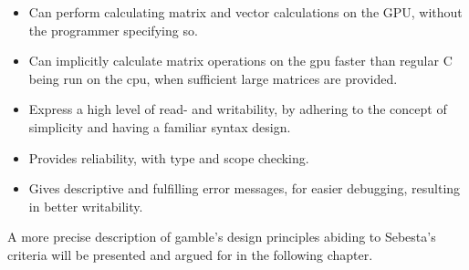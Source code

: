 \begin{itemize}
	\item Can perform calculating matrix and vector calculations on the GPU, without the programmer specifying so.
	\item Can implicitly calculate matrix operations on the \acrshort{gpu} faster than regular C being run on the \acrshort{cpu}, when sufficient large matrices are provided.
	\item Express a high level of read- and writability, by adhering to the concept of simplicity and having a familiar syntax design.
	\item Provides reliability, with type and scope checking.
	\item Gives descriptive and fulfilling error messages, for easier debugging, resulting in better writability.
\end{itemize}

A more precise description of \gls{gamble}'s design principles abiding to Sebesta's criteria will be presented and argued for in the following chapter.
